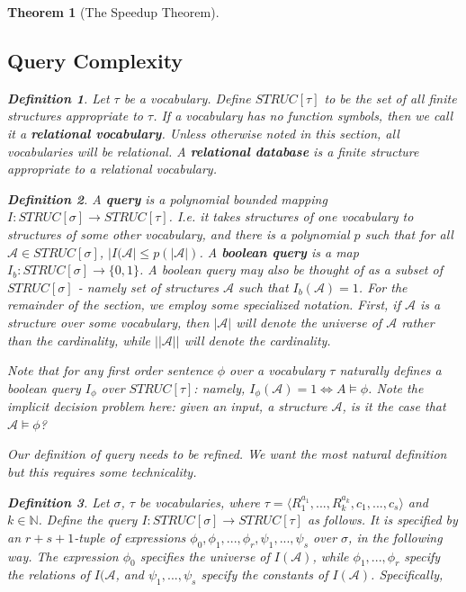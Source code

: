 \documentclass{article}
\theoremstyle{definition}
\newtheorem{definition}{Definition}[section]
\theoremstyle{plain}
\theoremstyle{theorem}
\newtheorem{theorem}{Theorem}[section]
\begin{document}
\begin{theorem}[The Speedup Theorem]
\subsection{Query Complexity}
\begin{definition}
	Let $\tau$ be a vocabulary. Define $STRUC[\tau]$ to be the set of all finite structures appropriate to $\tau$. If a vocabulary has no function symbols, then we call it a \textbf{relational vocabulary}. Unless otherwise noted in this section, all vocabularies will be relational. A \textbf{relational database} is a finite structure appropriate to a relational vocabulary.
\end{definition}
\begin{definition}
	A \textbf{query} is a polynomial bounded mapping $I: STRUC[\sigma] \to STRUC[\tau]$. I.e. it takes structures of one vocabulary to structures of some other vocabulary, and there is a polynomial $p$ such that for all $\mathcal{A} \in STRUC[\sigma]$, $|I(\mathcal{A}| \leq p(|\mathcal{A}|)$. A \textbf{boolean query} is a map $I_b: STRUC[\sigma] \to \{0,1\}$. A boolean query may also be thought of as a subset of $STRUC[\sigma]$ - namely set of structures $\mathcal{A}$ such that $I_b(\mathcal{A}) = 1$. 
For the remainder of the section, we employ some specialized notation. First, if $\mathcal{A}$ is a structure over some vocabulary, then $|\mathcal{A}|$ will denote the universe of $\mathcal{A}$ rather than the cardinality, while $||\mathcal{A}||$ will denote the cardinality.
\end{definition}
Note that for any first order sentence $\phi$ over a vocabulary $\tau$ naturally defines a boolean query $I_{\phi}$ over $STRUC[\tau]$: namely, $I_{\phi}(\mathcal{A}) = 1 \iff A \models \phi$. Note the implicit decision problem here: given an input, a structure $\mathcal{A}$, is it the case that $\mathcal{A} \models \phi$? 
\par Our definition of query needs to be refined. We want the most natural definition but this requires some technicality.
\begin{definition}
	Let $\sigma$, $\tau$ be vocabularies, where $\tau = \langle R_1^{a_1},...,R_k^{a_k},c_1,...,c_s \rangle$ and $k \in \mathbb{N}$. Define the query $I: STRUC[\sigma] \to STRUC[\tau]$ as follows. It is specified by an $r+s+1$-tuple of expressions $\phi_0,\phi_1,...,\phi_r,\psi_1,...,\psi_s$ over $\sigma$, in the following way. The expression $\phi_0$ specifies the universe of $I(\mathcal{A})$, while $\phi_1,...,\phi_r$ specify the relations of $I(\mathcal{A}$, and $\psi_1,...,\psi_s$ specify the constants of $I(\mathcal{A})$. Specifically, 

\end{definition}
\end{theorem}
\end{document}
